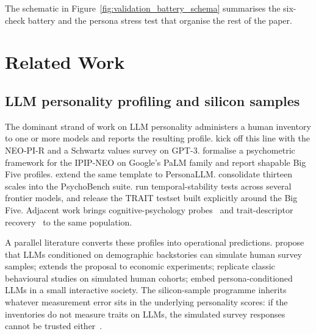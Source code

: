 \noindent The schematic in Figure~\ref{fig:validation_battery_schema} summarises the six-check battery and the persona stress test that organise the rest of the paper.

\section{Related Work}
\label{sec:related}

\subsection{LLM personality profiling and silicon samples}
\label{sec:related-profiling}

The dominant strand of work on LLM personality administers a human inventory to one or more models and reports the resulting profile. \citet{miotto2023gpt3} kick off this line with the NEO-PI-R and a Schwartz values survey on GPT-3. \citet{serapio2025psychometric} formalise a psychometric framework for the IPIP-NEO on Google's PaLM family and report shapable Big Five profiles. \citet{jiang2023personallm} extend the same template to PersonaLLM. \citet{huang2023psychobench} consolidate thirteen scales into the PsychoBench suite. \citet{bodroza2024personality} run temporal-stability tests across several frontier models, and \citet{lee2025trait} release the TRAIT testset built explicitly around the Big Five. Adjacent work brings cognitive-psychology probes~\citep{binz2023psychology} and trait-descriptor recovery~\citep{suh2024rediscovering} to the same population.

A parallel literature converts these profiles into operational predictions. \citet{argyle2023one} propose that LLMs conditioned on demographic backstories can simulate human survey samples; \citet{horton2023homo} extends the proposal to economic experiments; \citet{aher2023using} replicate classic behavioural studies on simulated human cohorts; \citet{park2023generative} embed persona-conditioned LLMs in a small interactive society. The silicon-sample programme inherits whatever measurement error sits in the underlying personality scores: if the inventories do not measure traits on LLMs, the simulated survey responses cannot be trusted either~\citep{tjuatja2023response,salecha2024llm}.

